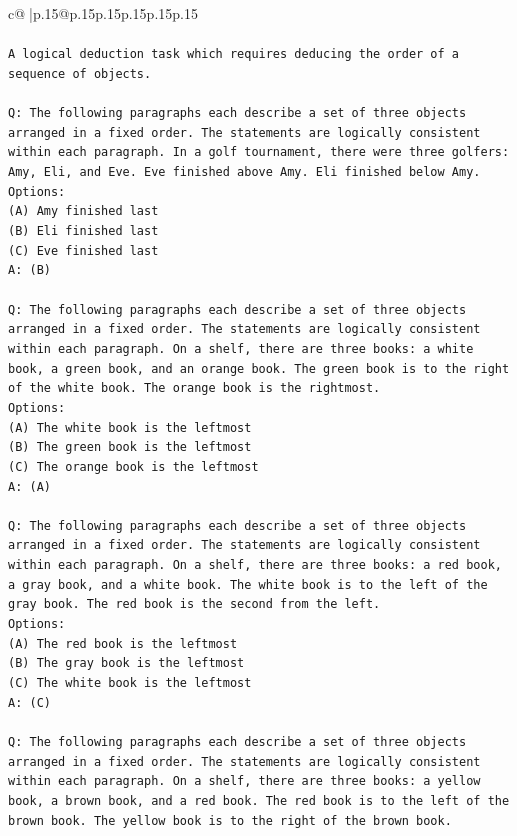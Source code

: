 \documentclass{article}
\begin{document}
{\begin{supertabular}{c@{$\;$}|p{.15\linewidth}@{}p{.15\linewidth}p{.15\linewidth}p{.15\linewidth}p{.15\linewidth}p{.15\linewidth}}
{{{\\ 
\\ 
\texttt{A logical deduction task which requires deducing the order of a sequence of objects.} \\
\\ 
\texttt{Q: The following paragraphs each describe a set of three objects arranged in a fixed order. The statements are logically consistent within each paragraph. In a golf tournament, there were three golfers: Amy, Eli, and Eve. Eve finished above Amy. Eli finished below Amy.} \\
\texttt{Options:} \\
\texttt{(A) Amy finished last} \\
\texttt{(B) Eli finished last} \\
\texttt{(C) Eve finished last} \\
\texttt{A: (B)} \\
\\ 
\texttt{Q: The following paragraphs each describe a set of three objects arranged in a fixed order. The statements are logically consistent within each paragraph. On a shelf, there are three books: a white book, a green book, and an orange book. The green book is to the right of the white book. The orange book is the rightmost.} \\
\texttt{Options:} \\
\texttt{(A) The white book is the leftmost} \\
\texttt{(B) The green book is the leftmost} \\
\texttt{(C) The orange book is the leftmost} \\
\texttt{A: (A)} \\
\\ 
\texttt{Q: The following paragraphs each describe a set of three objects arranged in a fixed order. The statements are logically consistent within each paragraph. On a shelf, there are three books: a red book, a gray book, and a white book. The white book is to the left of the gray book. The red book is the second from the left.} \\
\texttt{Options:} \\
\texttt{(A) The red book is the leftmost} \\
\texttt{(B) The gray book is the leftmost} \\
\texttt{(C) The white book is the leftmost} \\
\texttt{A: (C)} \\
\\ 
\texttt{Q: The following paragraphs each describe a set of three objects arranged in a fixed order. The statements are logically consistent within each paragraph. On a shelf, there are three books: a yellow book, a brown book, and a red book. The red book is to the left of the brown book. The yellow book is to the right of the brown book.} \\
}}}
\end{supertabular}}
\end{document}

